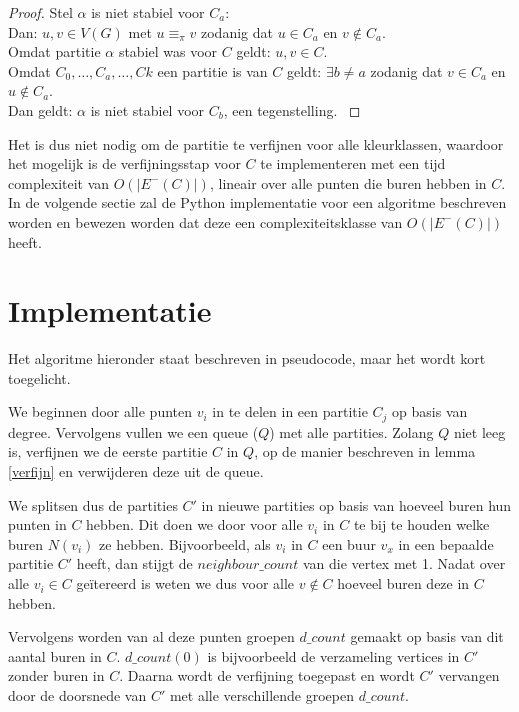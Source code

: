 \documentclass[twoside]{article}
\begin{document}
\begin{multicols}{2}
\begin{proof}
Stel $\alpha$ is niet stabiel voor $C_{a}$:\\
Dan: $ u,v \in V(G)$ met $u \equiv_{\pi} v$ zodanig dat $u \in C_{a}$ en $v \not \in C_{a}$.\\
Omdat partitie $\alpha$ stabiel was voor $C$ geldt: $u,v \in C$.\\
Omdat $C_{0},\ldots,C_{a},\ldots,C{k}$ een partitie is van $C$ geldt: $\exists b \neq a $ zodanig dat $v \in C_{a}$ en $u \not \in C_{a}$.\\
Dan geldt: $\alpha$ is niet stabiel voor $C_{b}$, een tegenstelling.
\cite{slides_DFA}
\end{proof}

Het is dus niet nodig om de partitie te verfijnen voor alle kleurklassen, waardoor het mogelijk is de verfijningsstap voor $C$ te implementeren met een tijd complexiteit van $O(|E^{-}(C)|)$, lineair over alle punten die buren hebben in $C$. In de volgende sectie zal de Python implementatie voor een algoritme beschreven worden en bewezen worden dat deze een complexiteitsklasse van $O(|E^{-}(C)|)$ heeft.


\section{Implementatie}
Het algoritme hieronder staat beschreven in pseudocode, maar het wordt kort toegelicht.

We beginnen door alle punten $v_i$ in te delen in een partitie $C_j$ op basis van degree. Vervolgens vullen we een queue ($Q$) met alle partities.
Zolang $Q$ niet leeg is, verfijnen we de eerste partitie $C$ in $Q$, op de manier beschreven in lemma \ref{verfijn} en verwijderen deze uit de queue.

We splitsen dus de partities $ C' $  in nieuwe partities op basis van hoeveel buren hun punten in $C$ hebben. Dit doen we door voor alle $v_{i}$ in $C$ te bij te houden welke buren $N(v_{i})$ ze hebben. Bijvoorbeeld, als $v_{i}$ in $C$ een buur $v_{x}$ in een bepaalde partitie $C'$ heeft, dan stijgt de $neighbour\_count$ van die vertex met 1. Nadat over alle $v_{i} \in C$ geïtereerd is weten we dus voor alle $v \not \in  C$ hoeveel buren deze in $C$ hebben.

Vervolgens worden van al deze punten groepen $d\_count$ gemaakt op basis van dit aantal buren in $C$. $d\_count(0)$ is bijvoorbeeld de verzameling vertices in $C'$ zonder buren in $C$. Daarna wordt de verfijning toegepast en wordt $C'$ vervangen door de doorsnede van $C'$ met alle verschillende groepen $d\_count$.


\end{multicols}
\end{document}
